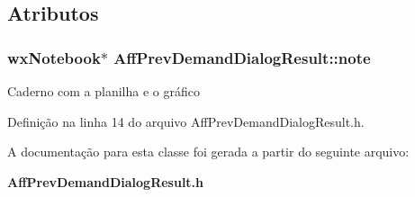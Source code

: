 \subsection{Atributos}
\subsubsection[{note}]{\setlength{\rightskip}{0pt plus 5cm}wx\+Notebook$\ast$ Aff\+Prev\+Demand\+Dialog\+Result\+::note\hspace{0.3cm}{\ttfamily [protected]}}\label{class_aff_prev_demand_dialog_result_acdfa8faa1ef3bc00fc47f51dbc3dd1a1}
Caderno com a planilha e o gráfico 

Definição na linha 14 do arquivo Aff\+Prev\+Demand\+Dialog\+Result.\+h.



A documentação para esta classe foi gerada a partir do seguinte arquivo\+:\begin{DoxyCompactItemize}
\item 
{\bf Aff\+Prev\+Demand\+Dialog\+Result.\+h}\end{DoxyCompactItemize}
